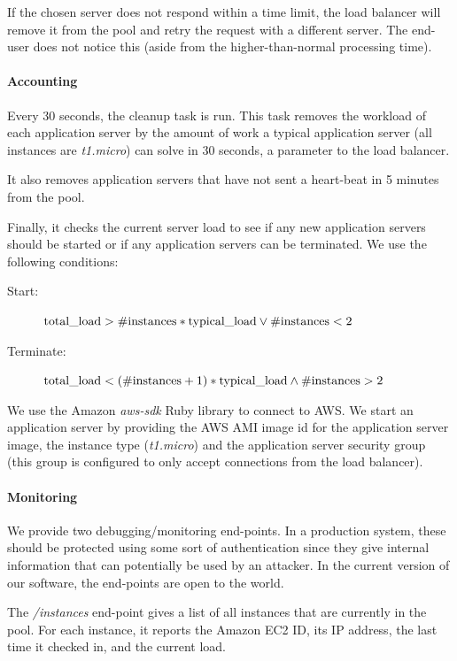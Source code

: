			If the chosen server does not respond within a time limit, the load balancer will remove it from the pool and retry the request with a different server.
			The end-user does not notice this (aside from the higher-than-normal processing time).
		
		\paragraph{Accounting}
			Every 30 seconds, the cleanup task is run.
			This task removes the workload of each application server by the amount of work a typical application server (all instances are \textit{t1.micro}) can solve in 30 seconds, a parameter to the load balancer.
			
			It also removes application servers that have not sent a heart-beat in 5 minutes from the pool.
			
			Finally, it checks the current server load to see if any new application servers should be started or if any application servers can be terminated.
			We use the following conditions:
			
			\begin{description}
				\item[Start:] $\textnormal{total\_load} > \#\textnormal{instances} * \textnormal{typical\_load} \lor \#\textnormal{instances} < 2$
				\item[Terminate:] $\textnormal{total\_load} < (\#\textnormal{instances} + 1) * \textnormal{typical\_load} \land \#\textnormal{instances} > 2$
			\end{description}
			
			We use the Amazon \textit{aws-sdk} Ruby library to connect to AWS.
			We start an application server by providing the AWS AMI image id for the application server image,
			the instance type (\textit{t1.micro}) and the application server security group (this group is configured to only accept connections from the load balancer).
		
		\paragraph{Monitoring}
			We provide two debugging/monitoring end-points.
			In a production system, these should be protected using some sort of authentication since they give internal information that can potentially be used by an attacker.
			In the current version of our software, the end-points are open to the world.
			
			The \textit{/instances} end-point gives a list of all instances that are currently in the pool.
			For each instance, it reports the Amazon EC2 ID, its IP address, the last time it checked in, and the current load.
			
